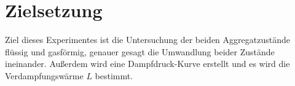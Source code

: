 \section{Zielsetzung}
\label{sec:Zielsetzung}

Ziel dieses Experimentes ist die Untersuchung der beiden Aggregatzustände flüssig und gasförmig, genauer gesagt die Umwandlung beider Zustände ineinander.
Außerdem wird eine Dampfdruck-Kurve erstellt und es wird die Verdampfungswärme $L$ bestimmt.